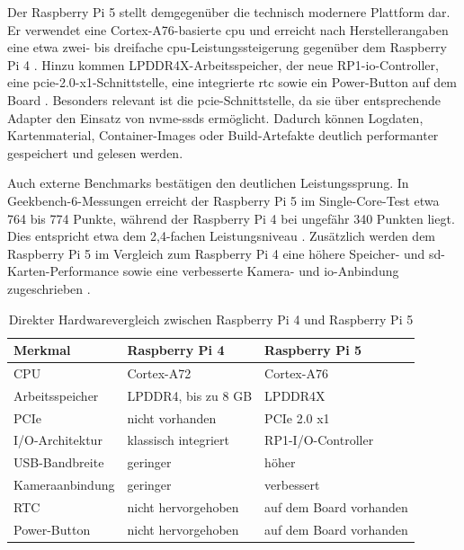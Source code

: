 Der Raspberry Pi 5 stellt demgegenüber die technisch modernere Plattform dar. Er verwendet eine Cortex-A76-basierte \gls{cpu} und erreicht nach Herstellerangaben eine etwa zwei- bis dreifache \gls{cpu}-Leistungssteigerung gegenüber dem Raspberry Pi 4 \cite[Abschnitte ``Overview'' und ``Specification'']{zotero-item-144}. Hinzu kommen LPDDR4X-Arbeitsspeicher, der neue RP1-\gls{io}-Controller, eine \gls{pcie}-2.0-x1-Schnittstelle, eine integrierte \gls{rtc} sowie ein Power-Button auf dem Board \cite[Abschnitte ``Overview'' und ``Specification'']{zotero-item-144}. Besonders relevant ist die \gls{pcie}-Schnittstelle, da sie über entsprechende Adapter den Einsatz von \gls{nvme}-\gls{ssd}s ermöglicht. Dadurch können Logdaten, Kartenmaterial, Container-Images oder Build-Artefakte deutlich performanter gespeichert und gelesen werden.

Auch externe Benchmarks bestätigen den deutlichen Leistungssprung. In Geekbench-6-Messungen erreicht der Raspberry Pi 5 im Single-Core-Test etwa 764 bis 774 Punkte, während der Raspberry Pi 4 bei ungefähr 340 Punkten liegt. Dies entspricht etwa dem 2,4-fachen Leistungsniveau \cite[Abschnitt ``Single core'']{zotero-item-146}. Zusätzlich werden dem Raspberry Pi 5 im Vergleich zum Raspberry Pi 4 eine höhere Speicher- und \gls{sd}-Karten-Performance sowie eine verbesserte Kamera- und \gls{io}-Anbindung zugeschrieben \cite[Abschnitte ``Performance'' sowie ``PCI, Cameras, Displays\ldots'']{zotero-item-147}.

\begin{table}[h]
    \centering
    \caption{Direkter Hardwarevergleich zwischen Raspberry Pi 4 und Raspberry Pi 5}
    \label{tab:rpi4_rpi5_vergleich}
    \begin{tabular}{lll}
        \hline
        \textbf{Merkmal} & \textbf{Raspberry Pi 4} & \textbf{Raspberry Pi 5} \\
        \hline
        CPU              & Cortex-A72              & Cortex-A76              \\
        Arbeitsspeicher  & LPDDR4, bis zu 8 GB     & LPDDR4X                 \\
        PCIe             & nicht vorhanden         & PCIe 2.0 x1             \\
        I/O-Architektur  & klassisch integriert    & RP1-I/O-Controller      \\
        USB-Bandbreite   & geringer                & höher                   \\
        Kameraanbindung  & geringer                & verbessert              \\
        RTC              & nicht hervorgehoben     & auf dem Board vorhanden \\
        Power-Button     & nicht hervorgehoben     & auf dem Board vorhanden \\
        \hline
    \end{tabular}
\end{table}

